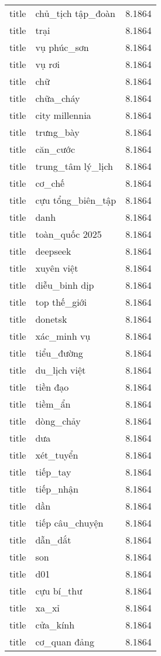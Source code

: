 \documentclass{article}
\begin{document}
\begin{tabular}{lll}
title & chủ\_tịch tập\_đoàn & 8.1864\\
title & trại & 8.1864\\
title & vụ phúc\_sơn & 8.1864\\
title & vụ rơi & 8.1864\\
title & chữ & 8.1864\\
title & chữa\_cháy & 8.1864\\
title & city millennia & 8.1864\\
title & trưng\_bày & 8.1864\\
title & căn\_cước & 8.1864\\
title & trung\_tâm lý\_lịch & 8.1864\\
title & cơ\_chế & 8.1864\\
title & cựu tổng\_biên\_tập & 8.1864\\
title & danh & 8.1864\\
title & toàn\_quốc 2025 & 8.1864\\
title & deepseek & 8.1864\\
title & xuyên việt & 8.1864\\
title & diễu\_binh dịp & 8.1864\\
title & top thế\_giới & 8.1864\\
title & donetsk & 8.1864\\
title & xác\_minh vụ & 8.1864\\
title & tiểu\_đường & 8.1864\\
title & du\_lịch việt & 8.1864\\
title & tiền đạo & 8.1864\\
title & tiềm\_ẩn & 8.1864\\
title & dòng\_chảy & 8.1864\\
title & dưa & 8.1864\\
title & xét\_tuyển & 8.1864\\
title & tiếp\_tay & 8.1864\\
title & tiếp\_nhận & 8.1864\\
title & dần & 8.1864\\
title & tiếp câu\_chuyện & 8.1864\\
title & dẫn\_dắt & 8.1864\\
title & son & 8.1864\\
title & d01 & 8.1864\\
title & cựu bí\_thư & 8.1864\\
title & xa\_xỉ & 8.1864\\
title & cửa\_kính & 8.1864\\
title & cơ\_quan đảng & 8.1864\\

\end{tabular}
\end{document}
